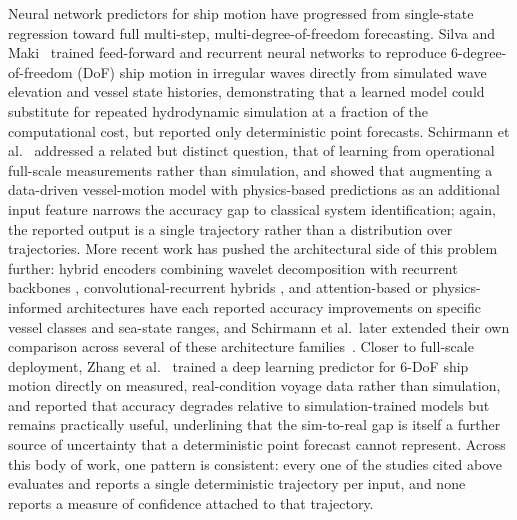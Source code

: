 \documentclass[a4paper,fleqn]{cas-sc}
\begin{document}
Neural network predictors for ship motion have progressed from single-state regression toward full multi-step, multi-degree-of-freedom forecasting. Silva and Maki~\cite{silva2022ship} trained feed-forward and recurrent neural networks to reproduce 6-degree-of-freedom (DoF) ship motion in irregular waves directly from simulated wave elevation and vessel state histories, demonstrating that a learned model could substitute for repeated hydrodynamic simulation at a fraction of the computational cost, but reported only deterministic point forecasts. Schirmann et al.~\cite{schirmann2022datadriven} addressed a related but distinct question, that of learning from operational full-scale measurements rather than simulation, and showed that augmenting a data-driven vessel-motion model with physics-based predictions as an additional input feature narrows the accuracy gap to classical system identification; again, the reported output is a single trajectory rather than a distribution over trajectories. More recent work has pushed the architectural side of this problem further: hybrid encoders combining wavelet decomposition with recurrent backbones \cite{gong2025wavelet}, convolutional-recurrent hybrids \cite{baier2021hybrid}, and attention-based or physics-informed architectures \cite{sun2022shipmotion, zhang2023roll} have each reported accuracy improvements on specific vessel classes and sea-state ranges, and Schirmann et al.\ later extended their own comparison across several of these architecture families~\cite{schirmann2023comparison}. Closer to full-scale deployment, Zhang et al.~\cite{zhang2023deep} trained a deep learning predictor for 6-DoF ship motion directly on measured, real-condition voyage data rather than simulation, and reported that accuracy degrades relative to simulation-trained models but remains practically useful, underlining that the sim-to-real gap is itself a further source of uncertainty that a deterministic point forecast cannot represent. Across this body of work, one pattern is consistent: every one of the studies cited above evaluates and reports a single deterministic trajectory per input, and none reports a measure of confidence attached to that trajectory.
\end{document}
